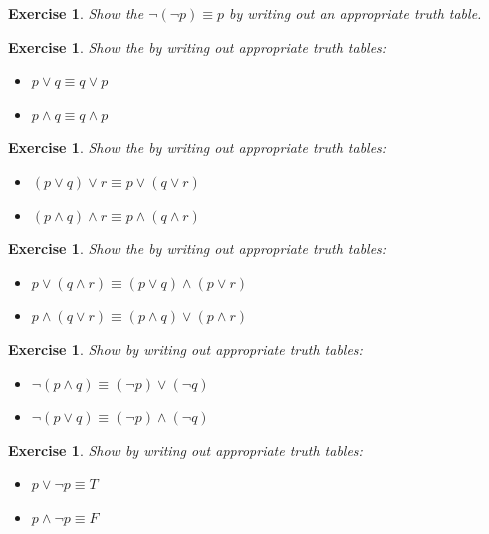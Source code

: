 \documentclass{book}
\newcounter{ekcounter}%
\theoremstyle{ekimcustom}
\newtheorem{exercise}[ekcounter]{Exercise}
\newcommand\defn[1]{{\color{blue}{\bf #1}}}
\begin{document}
\begin{exercise}
Show the \defn{double negation law} $\neg(\neg p) \equiv p$ by writing out an appropriate truth table.
\end{exercise}

\begin{exercise}
Show the \defn{commutative laws} by writing out appropriate truth tables:
\begin{itemize}
\item $p \vee q\equiv q \vee p$
\item $p \wedge q\equiv q \wedge p$
\end{itemize}
\end{exercise}

\begin{exercise}
Show the \defn{associative laws} by writing out appropriate truth tables:
\begin{itemize}
\item $(p \vee q) \vee r\equiv p \vee (q \vee r)$
\item $(p \wedge q) \wedge r \equiv p \wedge (q \wedge r)$
\end{itemize}
\end{exercise}

\begin{exercise}
Show the \defn{distributive laws} by writing out appropriate truth tables:
\begin{itemize}
\item $p \vee (q \wedge r) \equiv (p \vee q) \wedge (p \vee r)$
\item $p \wedge (q \vee r) \equiv (p \wedge q) \vee (p \wedge r)$
\end{itemize}
\end{exercise}

\begin{exercise}
Show \defn{De Morgan's laws} by writing out appropriate truth tables:
\begin{itemize}
\item $\neg (p \wedge q) \equiv (\neg p) \vee (\neg q)$
\item $\neg (p \vee q) \equiv (\neg p) \wedge (\neg q)$
\end{itemize}
\end{exercise}

\begin{exercise}
Show \defn{constant laws} by writing out appropriate truth tables:
\begin{itemize}
\item $p \vee \neg p \equiv T $
\item $p \wedge \neg p \equiv F$
\end{itemize}
\end{exercise}
\end{document}

